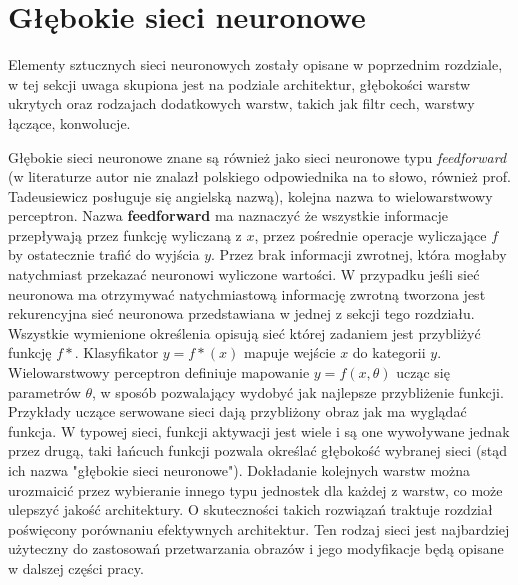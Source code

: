 \documentclass[12pt,a4paper,twoside,titlepage,openright]{book}
\begin{document}
\section{Głębokie sieci neuronowe}
Elementy sztucznych sieci neuronowych zostały opisane w poprzednim rozdziale, w tej sekcji uwaga skupiona jest na podziale architektur, głębokości warstw ukrytych oraz rodzajach dodatkowych warstw, takich jak filtr cech, warstwy łączące, konwolucje.

Głębokie sieci neuronowe znane są również jako sieci neuronowe typu \textit{feedforward} (w literaturze autor nie znalazł polskiego odpowiednika na to słowo, również prof. Tadeusiewicz posługuje się angielską nazwą), kolejna nazwa to wielowarstwowy perceptron. Nazwa \textbf{feedforward} ma naznaczyć że wszystkie informacje przepływają przez funkcję wyliczaną z \(x\), przez pośrednie operacje wyliczające \(f\) by ostatecznie trafić do wyjścia \(y\). Przez brak informacji zwrotnej, która mogłaby natychmiast przekazać neuronowi wyliczone wartości. W przypadku jeśli sieć neuronowa ma otrzymywać natychmiastową informację zwrotną tworzona jest rekurencyjna sieć neuronowa przedstawiana w jednej z sekcji tego rozdziału. Wszystkie wymienione określenia opisują sieć której zadaniem jest przybliżyć funkcję \(f*\). Klasyfikator \(y = f*(x) \) mapuje wejście \(x\) do kategorii \(y\). Wielowarstwowy perceptron definiuje mapowanie \(y = f(x,\theta)\) ucząc się parametrów \(\theta\), w sposób pozwalający wydobyć jak najlepsze przybliżenie funkcji. Przykłady uczące serwowane sieci dają przybliżony obraz jak ma wyglądać funkcja. W typowej sieci, funkcji aktywacji jest wiele i są one wywoływane jednak przez drugą, taki łańcuch funkcji pozwala określać głębokość wybranej sieci (stąd ich nazwa "głębokie sieci neuronowe"). Dokładanie kolejnych warstw można urozmaicić przez wybieranie innego typu jednostek dla każdej z warstw, co może ulepszyć jakość architektury. O skuteczności takich rozwiązań traktuje rozdział poświęcony porównaniu efektywnych architektur. Ten rodzaj sieci jest najbardziej użyteczny do zastosowań przetwarzania obrazów i jego modyfikacje będą opisane w dalszej części pracy.
\end{document}
